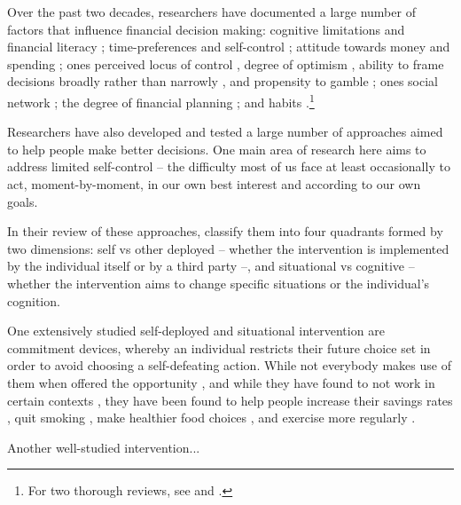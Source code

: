 Over the past two decades, researchers have documented a large number of
factors that influence financial decision making: cognitive limitations and
financial literacy \citep{agarwal2009age, agarwal2013cognitive,
    korniotis2011older, agarwal2010learning, fernandes2014financial,
jorring2020financial}; time-preferences and self-control
\citep{frederick2002time, read2018intertemporal, ericson2019intertemporal,
cohen2020measuring}; attitude towards money and spending
\citep{rick2008tightwads, rick2011fatal}; ones perceived locus of control
\citep{perry2005control}, degree of optimism \citep{puri2007optimism}, ability
to frame decisions broadly rather than narrowly \citep{kumar2008decision}, and
propensity to gamble \citep{kumar2009gambles}; ones social network
\citep{bailey2018economic, kuchler2021social}; the degree of financial planning
\citep{ameriks2003wealth}; and habits \citep{blumenstock2018defaults,
schaner2018persistent, de2013deposit}.\footnote{For two thorough reviews, see
\citet{agarwal2017shapes} and \citet{greenberg2019financial}.}

Researchers have also developed and tested a large number of approaches aimed
to help people make better decisions. One main area of research here aims to
address limited self-control -- the difficulty most of us face at least
occasionally to act, moment-by-moment, in our own best interest and according
to our own goals.

In their review of these approaches,
\citet{duckworth2019beyond} classify them into four quadrants formed by two
dimensions: self vs other deployed -- whether the intervention is implemented
by the individual itself or by a third party --, and situational vs cognitive
-- whether the intervention aims to change specific situations or the
individual's cognition.

One extensively studied self-deployed and situational intervention are
commitment devices, whereby an individual restricts their future choice set in
order to avoid choosing a self-defeating action. While not everybody makes use
of them when offered the opportunity \citep{bryan2010commitment}, and while
they have found to not work in certain contexts
\citep{laibson2015don,robinson2018some}, they have been found to help people
increase their savings rates \citep{ashraf2006tying}, quit smoking
\citep{gine2010put}, make healthier food choices \citep{schwartz2014healthier},
and exercise more regularly \citep{royer2015incentives}.

Another well-studied intervention...



